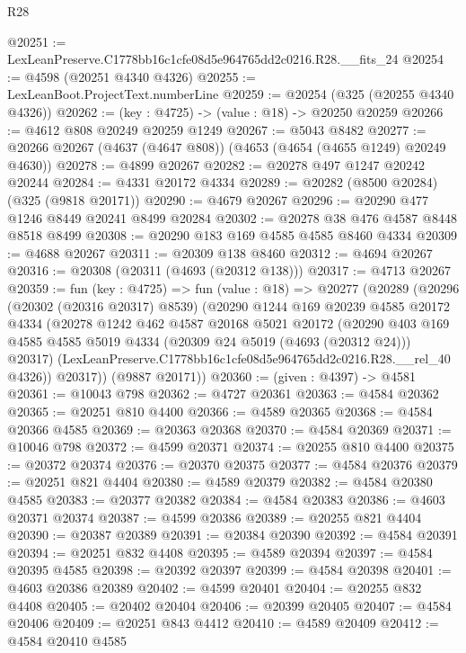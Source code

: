 \begin{lexlean}{R28}
\begin{coremodule}
@20251 := LexLeanPreserve.C1778bb16c1cfe08d5e964765dd2c0216.R28.__fits_24
@20254 := @4598 (@20251 @4340 @4326)
@20255 := LexLeanBoot.ProjectText.numberLine
@20259 := @20254 (@325 (@20255 @4340 @4326))
@20262 := (key : @4725) -> (value : @18) -> @20250 @20259
@20266 := @4612 @808 @20249 @20259 @1249
@20267 := @5043 @8482
@20277 := @20266 @20267 (@4637 (@4647 @808)) (@4653 (@4654 (@4655 @1249) @20249 @4630))
@20278 := @4899 @20267
@20282 := @20278 @497 @1247 @20242 @20244
@20284 := @4331 @20172 @4334
@20289 := @20282 (@8500 @20284) (@325 (@9818 @20171))
@20290 := @4679 @20267
@20296 := @20290 @477 @1246 @8449 @20241 @8499 @20284
@20302 := @20278 @38 @476 @4587 @8448 @8518 @8499
@20308 := @20290 @183 @169 @4585 @4585 @8460 @4334
@20309 := @4688 @20267
@20311 := @20309 @138 @8460
@20312 := @4694 @20267
@20316 := @20308 (@20311 (@4693 (@20312 @138)))
@20317 := @4713 @20267
@20359 := fun (key : @4725) =>
  fun (value : @18) =>
  @20277
    (@20289
      (@20296
        (@20302 (@20316 @20317) @8539)
        (@20290
          @1244
          @169
          @20239
          @4585
          @20172
          @4334
          (@20278
            @1242
            @462
            @4587
            @20168
            @5021
            @20172
            (@20290
              @403
              @169
              @4585
              @4585
              @5019
              @4334
              (@20309 @24 @5019 (@4693 (@20312 @24)))
              @20317)
            (LexLeanPreserve.C1778bb16c1cfe08d5e964765dd2c0216.R28.__rel_40 @4326))
          @20317))
      (@9887 @20171))
@20360 := (given : @4397) -> @4581
@20361 := @10043 @798
@20362 := @4727 @20361
@20363 := @4584 @20362
@20365 := @20251 @810 @4400
@20366 := @4589 @20365
@20368 := @4584 @20366 @4585
@20369 := @20363 @20368
@20370 := @4584 @20369
@20371 := @10046 @798
@20372 := @4599 @20371
@20374 := @20255 @810 @4400
@20375 := @20372 @20374
@20376 := @20370 @20375
@20377 := @4584 @20376
@20379 := @20251 @821 @4404
@20380 := @4589 @20379
@20382 := @4584 @20380 @4585
@20383 := @20377 @20382
@20384 := @4584 @20383
@20386 := @4603 @20371 @20374
@20387 := @4599 @20386
@20389 := @20255 @821 @4404
@20390 := @20387 @20389
@20391 := @20384 @20390
@20392 := @4584 @20391
@20394 := @20251 @832 @4408
@20395 := @4589 @20394
@20397 := @4584 @20395 @4585
@20398 := @20392 @20397
@20399 := @4584 @20398
@20401 := @4603 @20386 @20389
@20402 := @4599 @20401
@20404 := @20255 @832 @4408
@20405 := @20402 @20404
@20406 := @20399 @20405
@20407 := @4584 @20406
@20409 := @20251 @843 @4412
@20410 := @4589 @20409
@20412 := @4584 @20410 @4585

\end{coremodule}
\end{lexlean}
